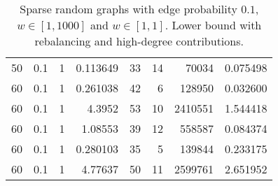 \documentclass[a4paper,11pt]{article}
\begin{document}
\begin{table}
\begin{center}
\begin{tabular}{|rrr|r|r|rr|r|}
50 & 0.1 & 1 & 0.113649 & 33 & 14 & 70034 & 0.075498 \\
60 & 0.1 & 1 & 0.261038 & 42 & 6 & 128950 & 0.032600 \\
60 & 0.1 & 1 & 4.3952 & 53 & 10 & 2410551 & 1.544418 \\
60 & 0.1 & 1 & 1.08553 & 39 & 12 & 558587 & 0.084374 \\
60 & 0.1 & 1 & 0.280103 & 35 & 5 & 139844 & 0.233175 \\
60 & 0.1 & 1 & 4.77637 & 50 & 11 & 2599761 & 2.651952 \\
\hline
\end{tabular}
\end{center}
\caption{Sparse random graphs with edge probability $0.1$,
  $w\in[1,1000]$ and $w\in[1,1]$. Lower bound with rebalancing and 
  high-degree contributions.}
\label{tab:sparse-highdegree}
\end{table}
\end{document}
